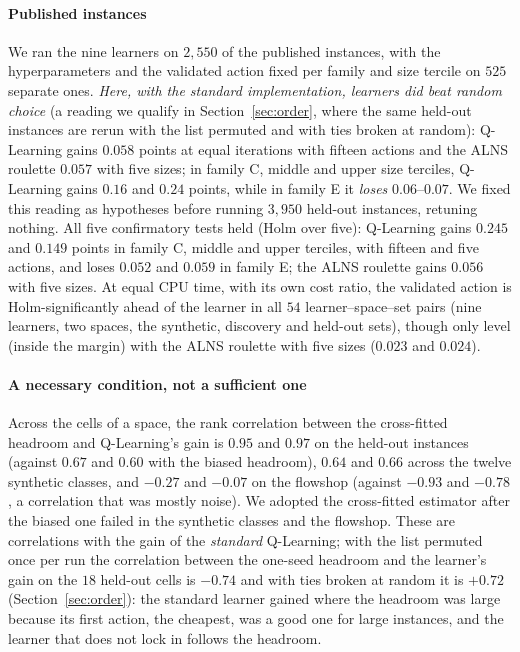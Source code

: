\paragraph{Published instances} We ran the nine learners on $2{,}550$ of the published instances, with the hyperparameters and the validated action fixed per family and size tercile on $525$ separate ones. \emph{Here, with the standard implementation, learners did beat random choice} (a reading we qualify in Section~\ref{sec:order}, where the same held-out instances are rerun with the list permuted and with ties broken at random): Q-Learning gains $0.058$ points at equal iterations with fifteen actions and the ALNS roulette $0.057$ with five sizes; in family C, middle and upper size terciles, Q-Learning gains $0.16$ and $0.24$ points, while in family E it \emph{loses} $0.06$--$0.07$. We fixed this reading as hypotheses before running $3{,}950$ held-out instances, retuning nothing. All five confirmatory tests held (Holm over five): Q-Learning gains $0.245$ and $0.149$ points in family C, middle and upper terciles, with fifteen and five actions, and loses $0.052$ and $0.059$ in family E; the ALNS roulette gains $0.056$ with five sizes. At equal CPU time, with its own cost ratio, the validated action is Holm-significantly ahead of the learner in all $54$ learner--space--set pairs (nine learners, two spaces, the synthetic, discovery and held-out sets), though only level (inside the margin) with the ALNS roulette with five sizes ($0.023$ and $0.024$).

\paragraph{A necessary condition, not a sufficient one} Across the cells of a space, the rank correlation between the cross-fitted headroom and Q-Learning's gain is $0.95$ and $0.97$ on the held-out instances (against $0.67$ and $0.60$ with the biased headroom), $0.64$ and $0.66$ across the twelve synthetic classes, and $-0.27$ and $-0.07$ on the flowshop (against $-0.93$ and $-0.78$, a correlation that was mostly noise). We adopted the cross-fitted estimator after the biased one failed in the synthetic classes and the flowshop. These are correlations with the gain of the \emph{standard} Q-Learning; with the list permuted once per run the correlation between the one-seed headroom and the learner's gain on the $18$ held-out cells is $-0.74$ and with ties broken at random it is $+0.72$ (Section~\ref{sec:order}): the standard learner gained where the headroom was large because its first action, the cheapest, was a good one for large instances, and the learner that does not lock in follows the headroom.

